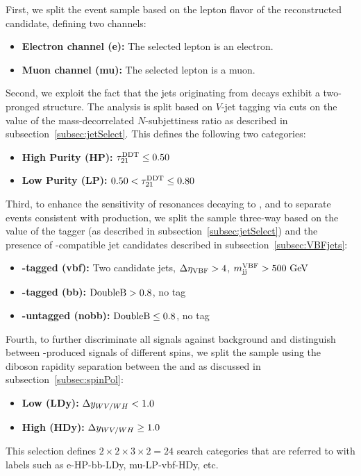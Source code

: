 First, we split the event sample based on the lepton flavor of the reconstructed \Wlep candidate, defining two channels:
\begin{itemize}
  \item {\bfseries Electron channel (e):} The selected lepton is an electron.
  \item {\bfseries Muon channel (mu):} The selected lepton is a muon.
\end{itemize}

Second, we exploit the fact that the jets originating from \VorH decays exhibit a two-pronged structure.
The analysis is split based on $V$-jet tagging via cuts on the value of the mass-decorrelated $N$-subjettiness ratio \nsubjDDT as described in subsection~\ref{subsec:jetSelect}.
This defines the following two categories:
\begin{itemize}
  \item {\bfseries High Purity (HP):} $\nsubjDDT\leq0.50$
  \item {\bfseries Low Purity (LP):} $0.50<\nsubjDDT\leq0.80$
\end{itemize}

Third, to enhance the sensitivity of resonances decaying to \WHtolnubbbar, and to separate events consistent with \VBF production, we split the sample three-way based on the value of the \DoubleB tagger (as described in subsection~\ref{subsec:jetSelect}) and the presence of \VBF-compatible jet candidates described in subsection~\ref{subsec:VBFjets}:
\begin{itemize}
  \item {\bfseries \VBF-tagged (vbf):} Two candidate \VBF jets, $\DetaVBF>4$, $\mjjVBF>500\unit{GeV}$
  \item {\bfseries \bbbar-tagged (bb):} $\DoubleB>0.8$, no \VBF tag
  \item {\bfseries \bbbar-untagged (nobb):} $\DoubleB\leq0.8$, no \VBF tag
\end{itemize}

Fourth, to further discriminate all signals against background and distinguish between \VBF-produced signals of different spins, we split the sample using the diboson rapidity separation \Dy between the \Wlep and \Vhad as discussed in subsection~\ref{subsec:spinPol}:
\begin{itemize}
  \item {\bfseries Low \Dy (LDy):} $\Dy<1.0$
  \item {\bfseries High \Dy (HDy):} $\Dy\geq1.0$
\end{itemize}

This selection defines $2\times2\times3\times2=24$ search categories that are referred to with labels such as e-HP-bb-LDy, mu-LP-vbf-HDy, etc.
